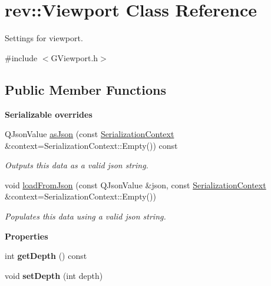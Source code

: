 \hypertarget{classrev_1_1_viewport}{}\section{rev\+::Viewport Class Reference}
\label{classrev_1_1_viewport}


Settings for viewport.  




{\ttfamily \#include $<$G\+Viewport.\+h$>$}

\subsection*{Public Member Functions}
\begin{Indent}\textbf{ Serializable overrides}\par
\begin{DoxyCompactItemize}
\item 
\mbox{\label{classrev_1_1_viewport_a5eb2af494374676e5d8dd0f1550bb98b}} 
Q\+Json\+Value \mbox{\hyperlink{classrev_1_1_viewport_a5eb2af494374676e5d8dd0f1550bb98b}{as\+Json}} (const \mbox{\hyperlink{structrev_1_1_serialization_context}{Serialization\+Context}} \&context=Serialization\+Context\+::\+Empty()) const
\begin{DoxyCompactList}\small\item\em Outputs this data as a valid json string. \end{DoxyCompactList}\item 
\mbox{\label{classrev_1_1_viewport_a63bf4e34f70e482cf534d6171d2b0070}} 
void \mbox{\hyperlink{classrev_1_1_viewport_a63bf4e34f70e482cf534d6171d2b0070}{load\+From\+Json}} (const Q\+Json\+Value \&json, const \mbox{\hyperlink{structrev_1_1_serialization_context}{Serialization\+Context}} \&context=Serialization\+Context\+::\+Empty())
\begin{DoxyCompactList}\small\item\em Populates this data using a valid json string. \end{DoxyCompactList}\end{DoxyCompactItemize}
\end{Indent}
\begin{Indent}\textbf{ Properties}\par
\begin{DoxyCompactItemize}
\item 
\mbox{\label{classrev_1_1_viewport_a4540d302fe18d3c54180d957b3cb2bb1}} 
int {\bfseries get\+Depth} () const
\item 
\mbox{\label{classrev_1_1_viewport_a12bd4740101a21615921c90df3abd4c6}} 
void {\bfseries set\+Depth} (int depth)
\end{DoxyCompactItemize}
\end{Indent}
